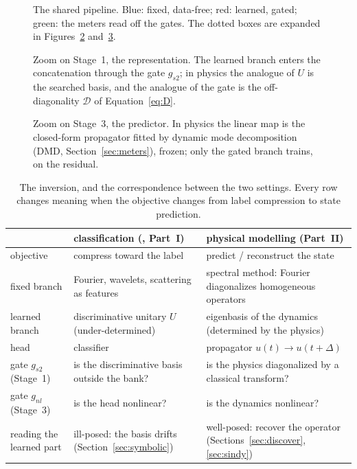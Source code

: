 \documentclass[11pt,a4paper]{article}
\newcommand{\Dm}{\mathcal{D}}
\begin{document}
\begin{figure}[t]
\centering\resizebox{\linewidth}{!}{\GlobalDiagram}
\caption{The shared pipeline. Blue: fixed, data-free; red: learned, gated; green: the meters read off the gates. The dotted boxes are expanded in Figures~\ref{fig:zoom-basis} and~\ref{fig:zoom-predictor}.}
\label{fig:global}
\end{figure}

\begin{figure}[t]
\centering\resizebox{0.95\linewidth}{!}{\BasisZoom}
\caption{Zoom on Stage~1, the representation. The learned branch enters the concatenation through the gate $g_{s2}$; in physics the analogue of $U$ is the searched basis, and the analogue of the gate is the off-diagonality $\Dm$ of Equation~\eqref{eq:D}.}
\label{fig:zoom-basis}
\end{figure}

\begin{figure}[t]
\centering\resizebox{0.95\linewidth}{!}{\PredictorZoom}
\caption{Zoom on Stage~3, the predictor. In physics the linear map is the closed-form propagator fitted by dynamic mode decomposition (DMD, Section~\ref{sec:meters}), frozen; only the gated branch trains, on the residual.}
\label{fig:zoom-predictor}
\end{figure}

\begin{table}[t]
\centering\small
\begin{tabularx}{\linewidth}{@{}l X X@{}}
\toprule
 & classification (\cite{flob}, Part~I) & physical modelling (Part~II) \\
\midrule
objective & compress toward the label & predict / reconstruct the state \\
fixed branch & Fourier, wavelets, scattering as features & spectral method: Fourier diagonalizes homogeneous operators \\
learned branch & discriminative unitary $U$ (under-determined) & eigenbasis of the dynamics (determined by the physics) \\
head & classifier & propagator $u(t)\to u(t+\Delta)$ \\
gate $g_{s2}$ (Stage~1) & is the discriminative basis outside the bank? & is the physics diagonalized by a classical transform? \\
gate $g_{nl}$ (Stage~3) & is the head nonlinear? & is the dynamics nonlinear? \\
reading the learned part & ill-posed: the basis drifts (Section~\ref{sec:symbolic}) & well-posed: recover the operator (Sections~\ref{sec:discover}, \ref{sec:sindy}) \\
\bottomrule
\end{tabularx}
\caption{The inversion, and the correspondence between the two settings. Every row changes meaning when the objective changes from label compression to state prediction.}
\label{tab:correspondence}
\end{table}
\end{document}
